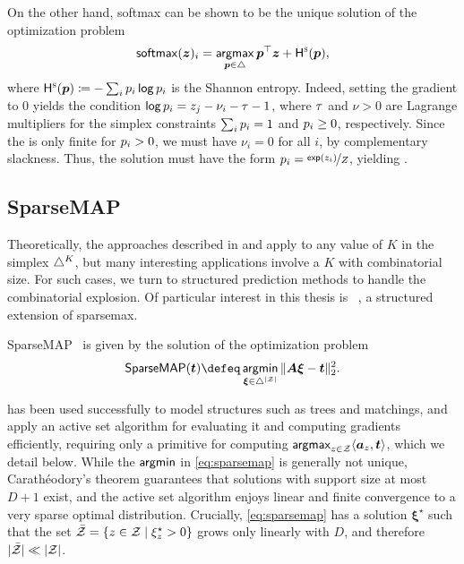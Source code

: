 On the other hand, softmax can be shown to be the unique solution of the optimization problem
\begin{equation}
    \operatorname*{\mathsf{softmax}}(\bm{z})_i =
    \operatorname*{\mathsf{argmax}}_{\bm{p} \in \triangle} \bm{p}^\top\bm{z} + \mathsf{H}^{\textsc{s}}(\bm{p}),
\end{equation}
where $\mathsf{H}^{\textsc{s}}(\bm{p}) \coloneqq -\sum_i p_i \operatorname*{\mathsf{log}} p_i$ is the Shannon entropy.
Indeed, setting the gradient to $0$ yields the condition
$\operatorname*{\mathsf{log}} p_i = z_j - \nu_i - \tau - 1$, where $\tau$ and $\nu > 0$ are Lagrange
multipliers for the simplex constraints $\sum_i p_i = 1$ and $p_i \geq 0$,
respectively. Since the \lhs is only finite for $p_i>0$,
we must have $\nu_i=0$ for all $i$, by complementary
slackness. Thus, the solution must have the form $p_i =
    \nicefrac{\operatorname*{\mathsf{exp}}(z_i)}{Z}$, yielding .

\subsection{SparseMAP}\label{sec:smap_bg}

\noindent Theoretically, the approaches described in 
and  apply to any value of $K$ in the simplex $\triangle^K$, but many
interesting applications involve a $K$ with
combinatorial size. For such cases, we turn to structured prediction
methods to handle the combinatorial explosion. Of particular
interest in this thesis is \smap~\citep{niculae2018sparsemap,
    sparsemapcg}, a structured extension of sparsemax.

\begin{definition}[SparseMAP]
    SparseMAP~\citep{niculae2018sparsemap,
        sparsemapcg} is given by the solution of the optimization problem
    \begin{equation}\label{eq:sparsemap}
        \smapop(\bm{t}) \defeq \argmin_{\pv \in \simplex^{|\ZZ|}}
        \|\bm{A}\pv - \bm{t}\|_2^2.
    \end{equation}
\end{definition}

\smap has been used successfully to model structures such as trees
and matchings, and \citet{niculae2018sparsemap} apply an active set
algorithm for evaluating it and computing gradients efficiently,
requiring only a primitive for computing $\operatorname*{\mathsf{argmax}}_{z \in \mathcal{Z}} \langle
    \bm{a}_z, \bm{t}\rangle$, which we detail below. While the
$\operatorname*{\mathsf{argmin}}$ in \eqref{eq:sparsemap} is generally not unique,
Carath\'eodory's theorem guarantees that solutions with support size
at most $D+1$ exist, and the active set algorithm enjoys linear and
finite convergence to a very sparse optimal distribution. Crucially,
\eqref{eq:sparsemap} has a solution $\bm{\xi}^\star$ such that the
set $\bar{\mathcal{Z}} = \left\{z \in \mathcal{Z} \mid \xi^\star_z > 0\right\}$ grows
only linearly with $D$, and therefore $|\bar{\mathcal{Z}}| \ll |\mathcal{Z}|$.

